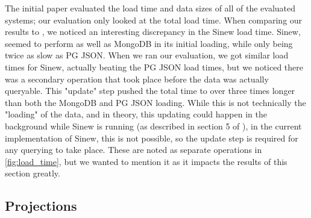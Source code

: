 \documentclass[sigconf]{acmart}
\begin{document}
The initial paper evaluated the load time and data sizes of all of the evaluated systems; our evaluation only looked at the total load time. When comparing our results to \cite{Tahara_Diamond_Abadi_2014}, we noticed an interesting discrepancy in the Sinew load time. Sinew, seemed to perform as well as MongoDB in its initial loading, while only being twice as slow as PG JSON. When we ran our evaluation, we got similar load times for Sinew, actually beating the PG JSON load times, but we noticed there was a secondary operation that took place before the data was actually queryable. This "update" step pushed the total time to over three times longer than both the MongoDB and PG JSON loading. While this is not technically the "loading" of the data, and in theory, this updating could happen in the background while Sinew is running (as described in section 5 of \cite{Tahara_Diamond_Abadi_2014}), in the current implementation of Sinew, this is not possible, so the update step is required for any querying to take place. These are noted as separate operations in \autoref{fig:load_time}, but we wanted to mention it as it impacts the results of this section greatly.

\subsection{Projections}
\end{document}
